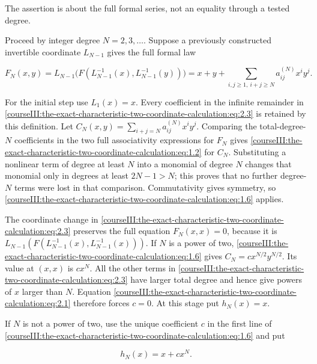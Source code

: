 The assertion is about the full formal series, not an equality through a tested degree.

Proceed by integer degree \(N=2,3,\ldots\). Suppose a previously constructed invertible coordinate \(L_{N-1}\) gives the full formal law

\begin{equation}
F_N(x,y)=L_{N-1}\bigl(F(L_{N-1}^{-1}(x),L_{N-1}^{-1}(y))\bigr)
 =x+y+\sum_{i,j\geq1,\ i+j\geq N}a^{(N)}_{ij}x^iy^j.
 \label{courseIII:the-exact-characteristic-two-coordinate-calculation:eq:2.3}
\end{equation}

For the initial step use \(L_1(x)=x\). Every coefficient in the infinite remainder in \eqref{courseIII:the-exact-characteristic-two-coordinate-calculation:eq:2.3} is retained by this definition. Let
\(C_N(x,y)=\sum_{i+j=N}a^{(N)}_{ij}x^iy^j\).
Comparing the total-degree-\(N\) coefficients in the two full associativity expressions for \(F_N\) gives \eqref{courseIII:the-exact-characteristic-two-coordinate-calculation:eq:1.2} for \(C_N\). Substituting a nonlinear term of degree at least \(N\) into a monomial of degree \(N\) changes that monomial only in degrees at least \(2N-1>N\); this proves that no further degree-\(N\) terms were lost in that comparison. Commutativity gives symmetry, so \eqref{courseIII:the-exact-characteristic-two-coordinate-calculation:eq:1.6} applies.

The coordinate change in \eqref{courseIII:the-exact-characteristic-two-coordinate-calculation:eq:2.3} preserves the full equation \(F_N(x,x)=0\), because it is \(L_{N-1}(F(L_{N-1}^{-1}(x),L_{N-1}^{-1}(x)))\). If \(N\) is a power of two, \eqref{courseIII:the-exact-characteristic-two-coordinate-calculation:eq:1.6} gives \(C_N=cx^{N/2}y^{N/2}\). Its value at \((x,x)\) is \(cx^N\). All the other terms in \eqref{courseIII:the-exact-characteristic-two-coordinate-calculation:eq:2.3} have larger total degree and hence give powers of \(x\) larger than \(N\). Equation \eqref{courseIII:the-exact-characteristic-two-coordinate-calculation:eq:2.1} therefore forces \(c=0\). At this stage put \(h_N(x)=x\).

If \(N\) is not a power of two, use the unique coefficient \(c\) in the first line of \eqref{courseIII:the-exact-characteristic-two-coordinate-calculation:eq:1.6} and put

\begin{equation}
h_N(x)=x+cx^N.
 \label{courseIII:the-exact-characteristic-two-coordinate-calculation:eq:2.4}
\end{equation}

